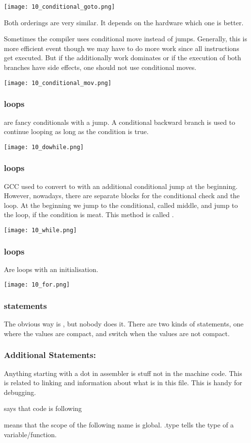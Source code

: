 \texttt{[image: 10\_conditional\_goto.png]}

Both orderings are very similar. It depends on the hardware which one is better.

Sometimes the compiler uses conditional move  instead of jumps. Generally, this is more efficient event though we may have to do more work since all instructions get executed. But if the additionally work dominates or if the execution of both branches have side effects, one should not use conditional moves.

\texttt{[image: 10\_conditional\_mov.png]}

\subsubsection{ loops}
 are fancy conditionals with a jump. A conditional backward branch is used to continue looping as long as the condition is true.

\texttt{[image: 10\_dowhile.png]}

\subsubsection{ loops}
GCC used to convert  to  with an additional conditional jump at the beginning. However, nowadays, there are separate blocks for the conditional check and the loop. At the beginning we jump to the conditional, called middle, and jump to the loop, if the condition is meat. This method is called .

\texttt{[image: 10\_while.png]}

\subsubsection{ loops}
Are  loops with an initialisation.

\texttt{[image: 10\_for.png]}

\subsubsection{ statements}
The obvious way is , but nobody does it. There are two kinds of statements, one where the values are compact, and switch when the values are not compact.

\subsubsection{Additional Statements:}
Anything starting with a dot in assembler is stuff not in the machine code. This is related to linking and information about what is in this file. This is handy for debugging.

 says that code is following

 means that the scope of the following name is global. .type tells the type of a variable/function.
